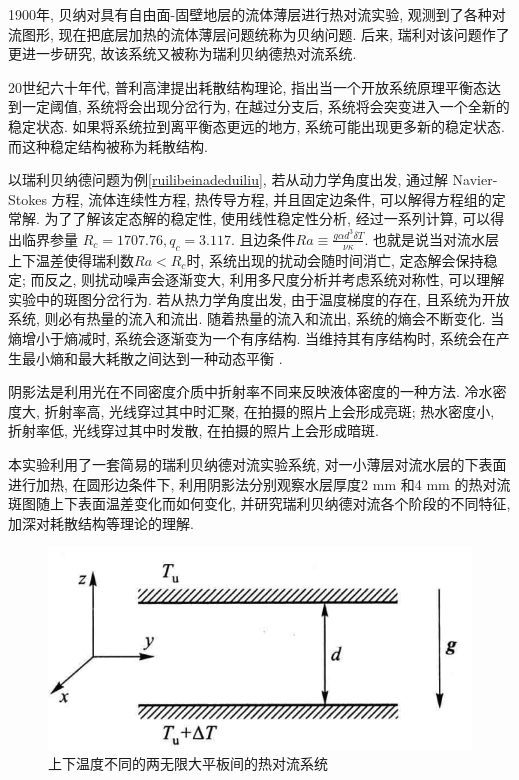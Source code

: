 \documentclass[font=default]{mpltx}
\begin{document}
  1900年, 贝纳对具有自由面-固壁地层的流体薄层进行热对流实验, 观测到了各种对流图形, 现在把底层加热的流体薄层问题统称为贝纳问题. 后来, 瑞利对该问题作了更进一步研究, 故该系统又被称为瑞利贝纳德热对流系统.
  \par
  20世纪六十年代, 普利高津提出耗散结构理论, 指出当一个开放系统原理平衡态达到一定阈值, 系统将会出现分岔行为, 在越过分支后, 系统将会突变进入一个全新的稳定状态. 
  如果将系统拉到离平衡态更远的地方, 系统可能出现更多新的稳定状态. 
  而这种稳定结构被称为耗散结构.
  \par
  以瑞利贝纳德问题为例\autoref{ruilibeinadeduiliu}, 若从动力学角度出发, 通过解 Navier-Stokes 方程, 流体连续性方程, 热传导方程, 并且固定边条件, 可以解得方程组的定常解. 为了了解该定态解的稳定性, 使用线性稳定性分析, 经过一系列计算,
  可以得出临界参量
  $R_c = 1707.76, q_c = 3.117$.
  且边条件$Ra\equiv\frac{g\alpha d^3\delta T}{\nu\kappa}$.
  也就是说当对流水层上下温差使得瑞利数$Ra < R_c$时, 系统出现的扰动会随时间消亡, 定态解会保持稳定; 而反之, 则扰动噪声会逐渐变大, 利用多尺度分析并考虑系统对称性, 可以理解实验中的斑图分岔行为.
  若从热力学角度出发, 由于温度梯度的存在, 且系统为开放系统, 则必有热量的流入和流出. 随着热量的流入和流出, 系统的熵会不断变化. 当熵增小于熵减时, 系统会逐渐变为一个有序结构.
  当维持其有序结构时, 系统会在产生最小熵和最大耗散之间达到一种动态平衡 \cite{jindaiwulishiyan}.
  \par
  阴影法是利用光在不同密度介质中折射率不同来反映液体密度的一种方法. 冷水密度大, 折射率高, 光线穿过其中时汇聚, 在拍摄的照片上会形成亮斑; 热水密度小, 折射率低, 光线穿过其中时发散, 在拍摄的照片上会形成暗斑.
  \par
  本实验利用了一套简易的瑞利贝纳德对流实验系统, 对一小薄层对流水层的下表面进行加热, 在圆形边条件下, 利用阴影法分别观察水层厚度2 mm 和4 mm 的热对流斑图随上下表面温差变化而如何变化,
  并研究瑞利贝纳德对流各个阶段的不同特征, 加深对耗散结构等理论的理解.
  
  \begin{figure}[htbp]
    \centering
    \includegraphics[width=0.85\linewidth]{fig/ruilibeinadeduiliu.png}
    \caption{上下温度不同的两无限大平板间的热对流系统
      }

    \label{fig:ruilibeinadeduiliu}
  \end{figure}
\end{document}
